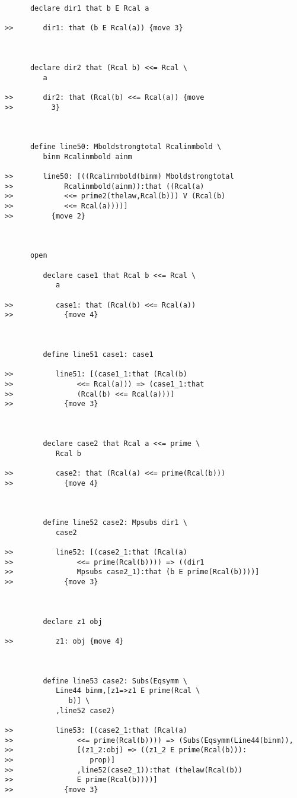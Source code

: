 \documentclass[12pt]{article}
\begin{document}
\begin{verbatim}
      declare dir1 that b E Rcal a

>>       dir1: that (b E Rcal(a)) {move 3}



      declare dir2 that (Rcal b) <<= Rcal \
         a

>>       dir2: that (Rcal(b) <<= Rcal(a)) {move
>>         3}



      define line50: Mboldstrongtotal Rcalinmbold \
         binm Rcalinmbold ainm

>>       line50: [((Rcalinmbold(binm) Mboldstrongtotal
>>            Rcalinmbold(ainm)):that ((Rcal(a)
>>            <<= prime2(thelaw,Rcal(b))) V (Rcal(b)
>>            <<= Rcal(a))))]
>>         {move 2}



      open

         declare case1 that Rcal b <<= Rcal \
            a

>>          case1: that (Rcal(b) <<= Rcal(a))
>>            {move 4}



         define line51 case1: case1

>>          line51: [(case1_1:that (Rcal(b)
>>               <<= Rcal(a))) => (case1_1:that
>>               (Rcal(b) <<= Rcal(a)))]
>>            {move 3}



         declare case2 that Rcal a <<= prime \
            Rcal b

>>          case2: that (Rcal(a) <<= prime(Rcal(b)))
>>            {move 4}



         define line52 case2: Mpsubs dir1 \
            case2

>>          line52: [(case2_1:that (Rcal(a)
>>               <<= prime(Rcal(b)))) => ((dir1
>>               Mpsubs case2_1):that (b E prime(Rcal(b))))]
>>            {move 3}



         declare z1 obj

>>          z1: obj {move 4}



         define line53 case2: Subs(Eqsymm \
            Line44 binm,[z1=>z1 E prime(Rcal \
               b)] \
            ,line52 case2)

>>          line53: [(case2_1:that (Rcal(a)
>>               <<= prime(Rcal(b)))) => (Subs(Eqsymm(Line44(binm)),
>>               [(z1_2:obj) => ((z1_2 E prime(Rcal(b))):
>>                  prop)]
>>               ,line52(case2_1)):that (thelaw(Rcal(b))
>>               E prime(Rcal(b))))]
>>            {move 3}




\end{verbatim}
\end{document}
